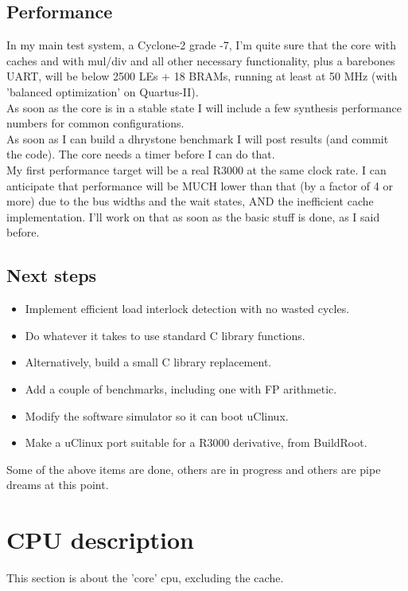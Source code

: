 \documentclass[11pt]{article}
\begin{document}
\subsection{Performance}
\label{performance}
    In my main test system, a Cyclone-2 grade -7, I'm quite sure that the core
    with caches and with mul/div and all other necessary functionality, plus 
    a barebones UART, will be below 2500 LEs + 18 BRAMs, running at least at 
    50 MHz (with 'balanced optimization' on Quartus-II).\\
    
    As soon as the core is in a stable state I will include a few synthesis
    performance numbers for common configurations.\\

    As soon as I can build a dhrystone benchmark I will post results (and commit
    the code). The core needs a timer before I can do that.\\
    
    My first performance target will be a real R3000 at the same clock rate.
    I can anticipate that performance will be MUCH lower than that (by a factor 
    of 4 or more) due to the bus widths and the wait states, AND the inefficient
    cache implementation. I'll work on that as soon as the basic stuff is done,
    as I said before.
   
\subsection{Next steps}
\label{next_steps}
    \begin{itemize}
    \item Implement efficient load interlock detection with no wasted cycles.
    \item Do whatever it takes to use standard C library functions.
    \item Alternatively, build a small C library replacement.
    \item Add a couple of benchmarks, including one with FP arithmetic.
    \item Modify the software simulator so it can boot uClinux.
    \item Make a uClinux port suitable for a R3000 derivative, from BuildRoot.
    \end{itemize}

    Some of the above items are done, others are in progress and others
    are pipe dreams at this point.
    
    
\section{CPU description}
\label{cpu_description}
    This section is about the 'core' cpu, excluding the cache.
\end{document}
